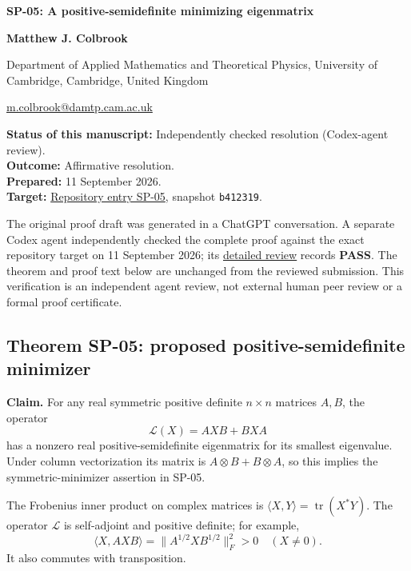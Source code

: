 \documentclass[10pt,a4paper]{article}
\begin{document}
{\raggedright\Large\bfseries SP-05: A positive-semidefinite minimizing
eigenmatrix\par}
\vspace{0.4em}
{\normalsize\bfseries Matthew J. Colbrook\par}
{\small Department of Applied Mathematics and Theoretical Physics,
University of Cambridge, Cambridge, United Kingdom\par}
{\small\href{mailto:m.colbrook@damtp.cam.ac.uk}{m.colbrook@damtp.cam.ac.uk}\par}
\vspace{0.6em}
\textbf{Status of this manuscript:} Independently checked resolution
(Codex-agent review).\\
\textbf{Outcome:} Affirmative resolution.\\
\textbf{Prepared:} 11 September 2026.\\
\textbf{Target:}
\href{https://github.com/ajt60gaibb/OpenProblemsInNLA/blob/b4123194697bdf6f8f82518c1dd7d6c40a30c2e0/eigenvalues-and-inverse-problems/SP-05/README.md}{Repository
entry SP-05}, snapshot \texttt{b412319}.

The original proof draft was generated in a ChatGPT conversation. A
separate Codex agent independently checked the complete proof against
the exact repository target on 11 September 2026; its
\href{https://github.com/ajt60gaibb/OpenProblemsInNLA/blob/main/references/colbrook-2026-09-11/verification/reviews/SP-05-review.md}{detailed
review} records \textbf{PASS}. The theorem and proof text below are
unchanged from the reviewed submission. This verification is an
independent agent review, not external human peer review or a formal
proof certificate.

\subsection{Theorem SP-05: proposed positive-semidefinite
minimizer}\label{theorem-sp-05-proposed-positive-semidefinite-minimizer}

\textbf{Claim.} For any real symmetric positive definite \(n\times n\)
matrices \(A,B\), the operator \[
\mathcal L(X)=AXB+BXA
\] has a nonzero real positive-semidefinite eigenmatrix for its smallest
eigenvalue. Under column vectorization its matrix is
\(A\otimes B+B\otimes A\), so this implies the symmetric-minimizer
assertion in SP-05.

The Frobenius inner product on complex matrices is
\(\langle X,Y\rangle=\operatorname{tr}(X^*Y)\). The operator
\(\mathcal L\) is self-adjoint and positive definite; for example, \[
\langle X,AXB\rangle=\|A^{1/2}XB^{1/2}\|_F^2>0
\quad(X\ne0).
\] It also commutes with transposition.
\end{document}
